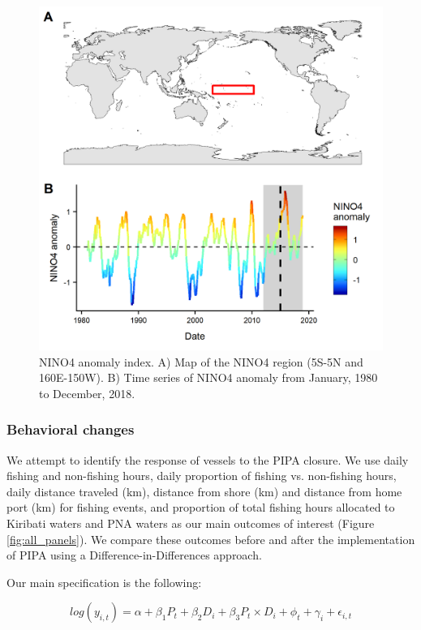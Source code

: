 \documentclass[12pt]{article}
\begin{document}
\begin{figure}
\centering
\includegraphics{img/nino_plot.png}
\caption{\label{fig:nino_plot}NINO4 anomaly index. A) Map of the NINO4 region (5S-5N and 160E-150W). B) Time series of NINO4 anomaly from January, 1980 to December, 2018.}
\end{figure}

\subsubsection{Behavioral changes}

We attempt to identify the response of vessels to the PIPA closure. We use daily fishing and non-fishing hours, daily proportion of fishing vs. non-fishing hours, daily distance traveled (km), distance from shore (km) and distance from home port (km) for fishing events, and proportion of total fishing hours allocated to Kiribati waters and PNA waters as our main outcomes of interest (Figure \ref{fig:all_panels}). We compare these outcomes before and after the implementation of PIPA using a Difference-in-Differences approach.

Our main specification is the following:

$$
log(y_{i,t}) = \alpha + \beta_1 P_t + \beta_2 D_i + \beta_3 P_t \times D_i + \phi_t + \gamma_i + \epsilon_{i,t}
\label{eqn:did}
$$
\end{document}
